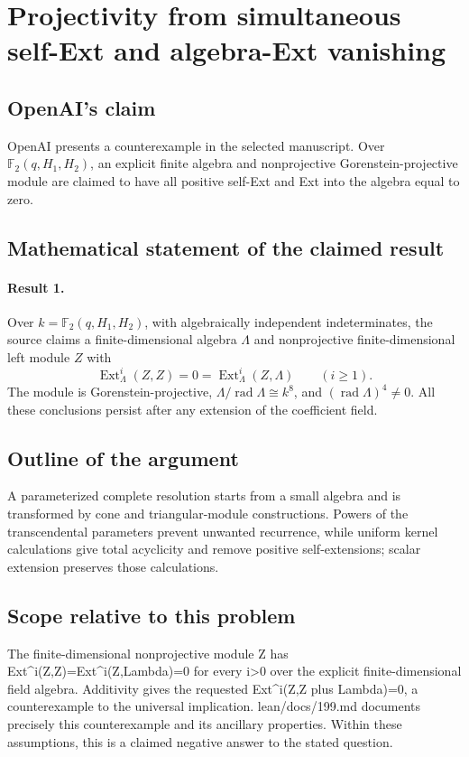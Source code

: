 \documentclass[11pt]{article}
\begin{document}
\section*{Projectivity from simultaneous self-Ext and algebra-Ext vanishing}

\subsection{OpenAI's claim}
OpenAI presents a counterexample in the selected manuscript. Over $\mathbb F_2(q,H_1,H_2)$, an explicit finite algebra and nonprojective Gorenstein-projective module are claimed to have all positive self-Ext and Ext into the algebra equal to zero.

\subsection{Mathematical statement of the claimed result}
\paragraph{Result 1.} Over \(k=\mathbb F_2(q,H_1,H_2)\), with algebraically independent indeterminates, the source claims a finite-dimensional algebra \(\Lambda\) and nonprojective finite-dimensional left module \(Z\) with
\[
 \operatorname{Ext}^i_\Lambda(Z,Z)=0=
 \operatorname{Ext}^i_\Lambda(Z,\Lambda)\qquad(i\ge1).
\]
The module is Gorenstein-projective, \(\Lambda/\operatorname{rad}\Lambda\cong k^8\), and \((\operatorname{rad}\Lambda)^4\ne0\). All these conclusions persist after any extension of the coefficient field.

\subsection{Outline of the argument}
A parameterized complete resolution starts from a small algebra and is transformed by cone and triangular-module constructions. Powers of the transcendental parameters prevent unwanted recurrence, while uniform kernel calculations give total acyclicity and remove positive self-extensions; scalar extension preserves those calculations.

\subsection{Scope relative to this problem}
The finite-dimensional nonprojective module Z has Ext\textasciicircum{}i(Z,Z)=Ext\textasciicircum{}i(Z,Lambda)=0 for every i>0 over the explicit finite-dimensional field algebra. Additivity gives the requested Ext\textasciicircum{}i(Z,Z plus Lambda)=0, a counterexample to the universal implication. lean/docs/199.md documents precisely this counterexample and its ancillary properties. Within these assumptions, this is a claimed negative answer to the stated question.
\end{document}
